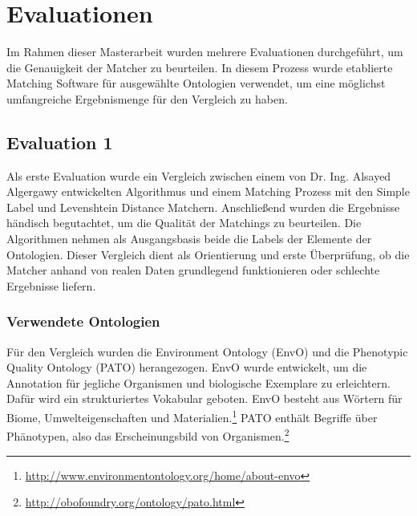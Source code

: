 %
\chapter{Evaluationen}
\label{chap:evaluation}
		
		Im Rahmen dieser Masterarbeit wurden mehrere Evaluationen durchgeführt, um die
		Genauigkeit der Matcher zu beurteilen. In diesem Prozess wurde etablierte
		Matching Software für ausgewählte Ontologien verwendet, um eine möglichst
		umfangreiche Ergebnismenge für den Vergleich zu haben.
		
		\section{Evaluation 1}
		\label{subsec:Evaluation 1}
		Als erste Evaluation wurde ein Vergleich zwischen einem von Dr. Ing. Alsayed
		Algergawy entwickelten Algorithmus und einem Matching Prozess mit den Simple
		Label und Levenshtein Distance Matchern. Anschließend wurden die Ergebnisse
		händisch begutachtet, um die Qualität der Matchings zu beurteilen. Die
		Algorithmen nehmen als Ausgangsbasis beide die Labels der Elemente der
		Ontologien. Dieser Vergleich dient als Orientierung und erste Überprüfung, ob
		die Matcher anhand von realen Daten grundlegend funktionieren oder schlechte Ergebnisse
		liefern.
		
		\subsection{Verwendete Ontologien}
		Für den Vergleich wurden die Environment Ontology (EnvO) und die Phenotypic
		Quality Ontology (PATO) herangezogen. EnvO wurde entwickelt, um die
		Annotation für jegliche Organismen und biologische Exemplare zu erleichtern.
		Dafür wird ein strukturiertes Vokabular geboten. EnvO besteht aus Wörtern für
		Biome, Umwelteigenschaften und
		Materialien.\footnote{\url{http://www.environmentontology.org/home/about-envo}}
		PATO enthält Begriffe über
		Phänotypen, also das
		Erscheinungsbild von
		Organismen.\footnote{\url{http://obofoundry.org/ontology/pato.html}}
		
